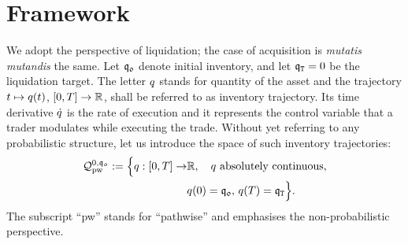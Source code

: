 \documentclass[10pt,a4paper]{article}
\begin{document}

	

	
		
	\section{Framework} \label{sec.framework}
	We adopt the perspective of liquidation; the case of acquisition is \emph{mutatis mutandis} the same. Let $\mathfrak{q_0}$ denote initial inventory, and let $\mathfrak{q}_{\mathtt{T} }=0$ be the liquidation target. The letter $q$ stands for quantity of the asset and the trajectory $t\mapsto q(t)$, ${[0,T]} \rightarrow \mathbb{R}$, shall be referred to as inventory trajectory. Its time derivative $\dot{q}$ is the rate of execution and it represents the control variable that a trader modulates while executing the trade. Without yet referring to any probabilistic structure, let us introduce the space of such inventory trajectories:
	\begin{equation*}
	\begin{split}
	\mathcal{Q}^{0,\mathfrak{q_0}}_{\text{pw}} := \Big\lbrace
	q:{[0,T]}\rightarrow & \mathbb{R},  \quad  q \text{ absolutely continuous},\\ &  q(0) = \mathfrak{q_0}, \, q(T) = \mathfrak{q}_{\mathtt{T} }\Big\rbrace.
	\end{split}
	\end{equation*}
	The subscript ``pw'' stands for ``pathwise'' and emphasises the  non-probabilistic perspective. 
	
\end{document}
